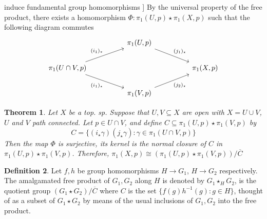 \documentclass[10pt, openany]{book}
\theoremstyle{plain}
\newtheorem{theorem}{Theorem}[section]
\theoremstyle{definition}
\newtheorem{definition}[theorem]{Definition}
\theoremstyle{remark}
\begin{document}
induce fundamental group homomorphisms
]
By the universal property of the free product, there exists a homomorphism $\Phi: \pi_{1}(U,p)\star\pi_{1}(X,p)$ such that the following diagram commutes
\[\begin{tikzcd}
	&& {\pi_1(U,p)} && \\
	{\pi_1(U\cap V,p)} &&&& {\pi_1(X,p)} \\
	&& {\pi_1(V,p)}
	\arrow["{(j_1)_\star}", from=1-3, to=2-5]
	\arrow["{(i_1)_{\ast}}", from=2-1, to=1-3]
	\arrow["{(i_1)_{\star}}"', from=2-1, to=3-3]
	\arrow["{(j_2)_\star}"', from=3-3, to=2-5]
\end{tikzcd}\]
\begin{theorem}

Let $X$ be a top. sp. Suppose that $U,V\subseteq X$ are open with $X = U\cup V$, $U$ and $V$ path connected. Let $p\in U\cap V$, and define $C\subseteq \pi_{1}(U,p)\star \pi_{1}(V,p)$ by $$C = \{(i_{\star}\gamma)(j_{\star}\gamma) : \gamma\in\pi_{1}(U\cap V, p)\}$$
Then the map $\Phi$ is surjective, its kernel is the normal closure of $C$ in $\pi_1(U,p)\star\pi_1(V,p)$. Therefore, $\pi_{1}(X,p)\cong (\pi_1(U,p)\star\pi_1(V,p))/\overline{C}$
\end{theorem}

\begin{definition}
    Let $f, h$ be group homomorphisms $H\rightarrow G_1$, $H\rightarrow G_2$ respectively. The amalgamated free product of $G_1, G_2$ along $H$ is denoted by $G_1\star_{H}G_2$, is the quotient group $(G_1\star G_2)/\overline{C}$ where $C$ is the set $\{f(g)h^{-1}(g) : g\in H\}$, thought of as a subset of $G_1\star G_2$ by means of the usual inclusions of $G_1,G_2$ into the free product.
\end{definition}
\end{document}
